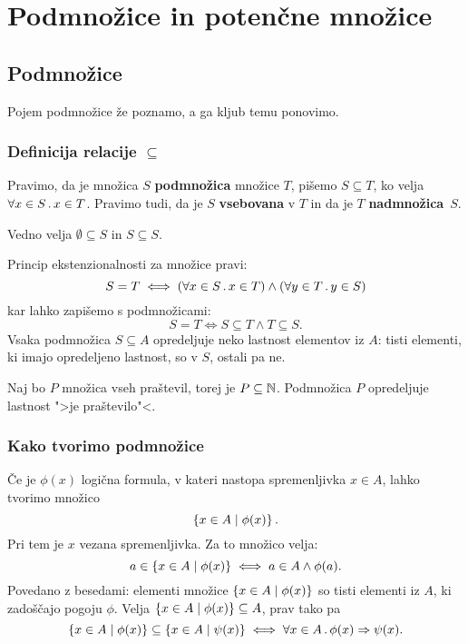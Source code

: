 \chapter{Podmnožice in potenčne množice}

\section{Podmnožice}

Pojem podmnožice že poznamo, a ga kljub temu ponovimo.

\subsection{Definicija relacije $\subseteq$}

Pravimo, da je množica $S$ \textbf{podmnožica} množice $T$, pišemo $S \subseteq T$, ko velja $\forall x \in S \,.\, x \in T$. Pravimo tudi, da je $S$ \textbf{vsebovana} v $T$ in da je $T$ \textbf{nadmnožica}~$S$.

Vedno velja $\emptyset \subseteq S$ in $S \subseteq S$.

Princip ekstenzionalnosti za množice pravi:
%
\begin{equation*}
  S = T \iff (\forall x \in S \,.\, x \in T) \land (\forall y \in T \,.\, y \in S)
\end{equation*}
%
kar lahko zapišemo s podmnožicami:
%
\begin{equation*}
  S = T \iff S \subseteq T \land T \subseteq S.
\end{equation*}
%
Vsaka podmnožica $S \subseteq A$ opredeljuje neko lastnost elementov iz $A$: tisti
elementi, ki imajo opredeljeno lastnost, so v $S$, ostali pa ne.

\begin{primer}
  Naj bo $P$ množica vseh praštevil, torej je $P \subseteq \mathbb{N}$. Podmnožica $P$
  opredeljuje lastnost ">je praštevilo"<.
\end{primer}


\subsection{Kako tvorimo podmnožice}

Če je $\phi(x)$ logična formula, v kateri nastopa spremenljivka $x \in A$, lahko tvorimo množico
%
\begin{equation*}
    \left\{ x \in A \; \middle| \; \phi(x) \right\}.
\end{equation*}
%
Pri tem je $x$ vezana spremenljivka. Za to množico velja:
%
\begin{equation*}
    a \in \left\{ x \in A \; \middle| \; \phi(x) \right\} \iff a \in A \land \phi(a).
\end{equation*}
%
Povedano z besedami: elementi množice $\left\{ x \in A \; \middle| \; \phi(x) \right\}$ so tisti elementi iz $A$, ki zadoščajo pogoju $\phi$.
%
Velja $\left\{ x \in A \; \middle| \; \phi(x) \right\} \subseteq A$, prav tako pa
\begin{equation*}
  \left\{x \in A \mid \phi(x)\right\} \subseteq \left\{x \in A \mid \psi(x)\right\} \iff
  \forall x \in A \,.\, \phi(x) \Rightarrow \psi(x).
\end{equation*}



